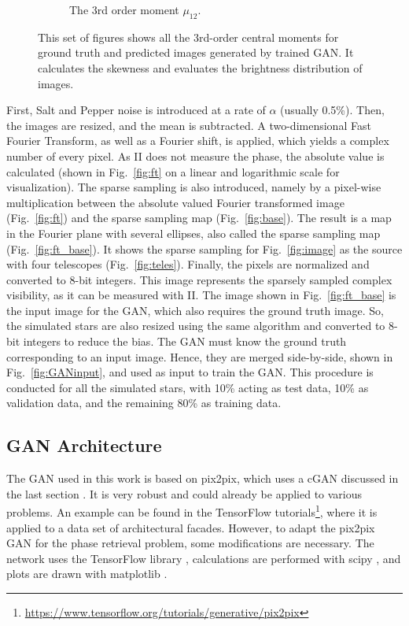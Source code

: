 \begin{figure}
\begin{subfigure}{0.50\linewidth}
		\caption{The 3rd order moment $\mu_{12}$.}
		\label{fig:mom10}
	\end{subfigure}\hfill
	\caption{This set of figures shows all the 3rd-order central moments for ground truth and predicted images generated by trained GAN. It calculates the skewness and evaluates the brightness distribution of images.}
	\label{fig:moments}
\end{figure}

First, Salt and Pepper noise is introduced at a rate of $\alpha$ (usually 0.5\%). Then, the images are resized, and the mean is subtracted. A two-dimensional Fast Fourier Transform, as well as a Fourier shift, is applied, which yields a complex number of every pixel. As II does not measure the phase, the absolute value is calculated (shown in Fig.~\ref{fig:ft} on a linear and logarithmic scale for visualization). The sparse sampling is also introduced, namely by a pixel-wise multiplication between the absolute valued Fourier transformed image (Fig.~\ref{fig:ft}) and the sparse sampling map (Fig.~\ref{fig:base}). The result is a map in the Fourier plane with several ellipses, also called the sparse sampling map (Fig.~\ref{fig:ft_base}). It shows the sparse sampling for Fig.~\ref{fig:image} as the source with four telescopes (Fig.~\ref{fig:teles}). Finally, the pixels are normalized and converted to 8-bit integers. This image represents the sparsely sampled complex visibility, as it can be measured with II. The image shown in Fig.~\ref{fig:ft_base} is the input image for the GAN, which also requires the ground truth image. So, the simulated stars are also resized using the same algorithm and converted to 8-bit integers to reduce the bias. The GAN must know the ground truth corresponding to an input image. Hence, they are merged side-by-side, shown in Fig.~\ref{fig:GANinput}, and used as input to train the GAN. This procedure is conducted for all the simulated stars, with 10\% acting as test data, 10\% as validation data, and the remaining 80\% as training data. 

\subsection{GAN Architecture}
The GAN used in this work is based on pix2pix, which uses a cGAN discussed in the last section \cite{isola2017image}. It is very robust and could already be applied to various problems. An example can be found in the TensorFlow tutorials\footnote{\url{https://www.tensorflow.org/tutorials/generative/pix2pix}}, where it is applied to a data set of architectural facades. However, to adapt the pix2pix GAN for the phase retrieval problem, some modifications are necessary. The network uses the TensorFlow library \cite{abadi2016tensorflow}, calculations are performed with scipy \cite{virtanen2020scipy}, and plots are drawn with matplotlib \cite{4160265}.

